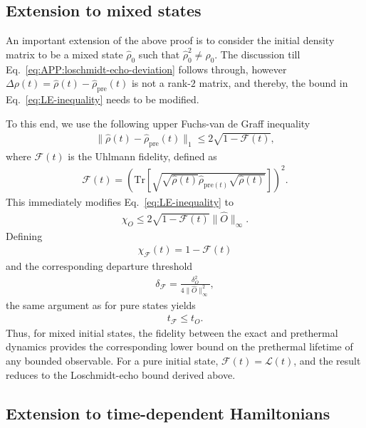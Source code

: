 \documentclass[aps,prl,amsfonts,floatfix,superscriptaddress,longbibliography,twocolumn,footinbib]{revtex4-2}
\begin{document}
\subsection{Extension to mixed states}
\label{App:Mixed}
An important extension of the above proof is to consider the initial density matrix to be a mixed state $\hat\rho_0$ such that $\hat\rho_0^2 \neq \hat \rho_0 $. The discussion till Eq.~\eqref{eq:APP:loschmidt-echo-deviation} follows through, however $\Delta\rho(t) = \hat\rho(t) - \hat\rho_{\text{pre}}(t)$ is not a rank-$2$ matrix, and thereby, the bound in Eq.~\eqref{eq:LE-inequality} needs to be modified.

To this end, we use the following upper Fuchs-van de Graff inequality 
\begin{align}
    \| \hat\rho(t) - \hat\rho_{\text{pre}}(t) \|_1 \le 2 \sqrt{1 - \mathcal{F}(t)},
\end{align}
where $\mathcal{F}(t)$ is the Uhlmann fidelity, defined as 
\begin{align}
    \mathcal{F}(t) = \left( \text{Tr}\left[ \sqrt{\sqrt{\hat\rho(t) }\hat\rho_{\text{pre}(t) } \sqrt{\hat\rho(t) }} \right] \right)^2.
\end{align}
This immediately modifies Eq.~\eqref{eq:LE-inequality} to 
\begin{align}
    \chi_O\le 2 \sqrt{1- \mathcal{F}(t)} \| \hat{O}\|_\infty.
\end{align}
Defining
\begin{align}
\chi_{\mathcal F}(t)=1-\mathcal F(t)
\end{align}
and the corresponding departure threshold
\begin{align}
\delta_{\mathcal F}
=
\frac{\delta_O^2}{4\|\hat O\|_\infty^2},
\end{align}
the same argument as for pure states yields
\begin{align}
t_{\mathcal F}\leq t_O.
\end{align}
Thus, for mixed initial states, the fidelity between the exact and
prethermal dynamics provides the corresponding lower bound on the
prethermal lifetime of any bounded observable. For a pure initial state,
$\mathcal F(t)=\mathcal L(t)$, and the result reduces to the
Loschmidt-echo bound derived above.


\subsection{Extension to time-dependent Hamiltonians}
\label{App:TimeDependent}
\end{document}
